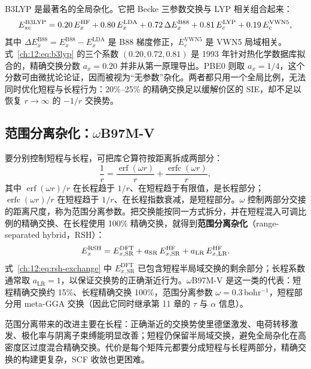 B3LYP 是最著名的全局杂化\citep{becke1993b3lyp,lee1988}。它把 Becke 三参数交换与 LYP 相关组合起来：
\begin{equation}
E_{\mathrm{xc}}^{\mathrm{B3LYP}}
= 0.20\,E_x^{\mathrm{HF}}
+ 0.80\,E_x^{\mathrm{LDA}}
+ 0.72\,\Delta E_x^{\mathrm{B88}}
+ 0.81\,E_c^{\mathrm{LYP}}
+ 0.19\,E_c^{\mathrm{VWN5}},
\label{ch:12:eq:b3lyp}
\end{equation}
其中 $\Delta E_x^{\mathrm{B88}}=E_x^{\mathrm{B88}}-E_x^{\mathrm{LDA}}$ 是 B88 梯度修正，$E_c^{\mathrm{VWN5}}$ 是 VWN5 局域相关。式~\eqref{ch:12:eq:b3lyp} 的三个系数 $(0.20,0.72,0.81)$ 是 1993 年针对热化学数据库拟合的，精确交换分数 $a_x=0.20$ 并非从第一原理导出。PBE0 则取 $a_x=1/4$，这个分数可由微扰论论证，因而被视为“无参数”杂化\citep{adamo1999pbe0}。两者都只用一个全局比例，无法同时优化短程与长程行为：20\%--25\% 的精确交换足以缓解价区的 SIE，却不足以恢复 $r\to\infty$ 的 $-1/r$ 交换势。

\subsection{范围分离杂化：\texorpdfstring{$\omega$B97M-V}{wB97M-V}}
\label{ch:12:sec:rsh}

要分别控制短程与长程，可把库仑算符按距离拆成两部分：
\begin{equation}
\frac{1}{r}
= \frac{\operatorname{erf}(\omega r)}{r}
+ \frac{\operatorname{erfc}(\omega r)}{r},
\label{ch:12:eq:range-separation}
\end{equation}
其中 $\operatorname{erf}(\omega r)/r$ 在长程趋于 $1/r$、在短程趋于有限值，是长程部分；$\operatorname{erfc}(\omega r)/r$ 在短程趋于 $1/r$、在长程指数衰减，是短程部分。$\omega$ 控制两部分交接的距离尺度，称为范围分离参数。把交换能按同一方式拆分，并在短程混入可调比例的精确交换、在长程使用 100\% 精确交换，就得到\textbf{范围分离杂化}（range-separated hybrid，RSH）：
\begin{equation}
E_x^{\mathrm{RSH}}
= E_{x,\mathrm{SR}}^{\mathrm{DFT}}
+ a_{\mathrm{SR}}\,E_{x,\mathrm{SR}}^{\mathrm{HF}}
+ a_{\mathrm{LR}}\,E_{x,\mathrm{LR}}^{\mathrm{HF}}.
\label{ch:12:eq:rsh-exchange}
\end{equation}
式~\eqref{ch:12:eq:rsh-exchange} 中 $E_{x,\mathrm{SR}}^{\mathrm{DFT}}$ 已包含短程半局域交换的剩余部分；长程系数通常取 $a_{\mathrm{LR}}=1$，以保证交换势的正确渐近行为。$\omega$B97M-V 是这一类的代表\citep{mardirossian2016wb97mv}：短程精确交换约 15\%、长程精确交换 100\%，范围分离参数 $\omega=0.3$\,bohr$^{-1}$，短程部分用 meta-GGA 交换（因此它同时继承第 11 章的 $\tau$ 与 $\alpha$ 信息）。

范围分离带来的改进主要在长程：正确渐近的交换势使里德堡激发、电荷转移激发、极化率与阴离子束缚能明显改善；短程仍保留半局域交换，避免全局杂化在高密度区过度混合精确交换。代价是每个矩阵元都要分成短程与长程两部分，精确交换的构建更复杂，SCF 收敛也更困难。

